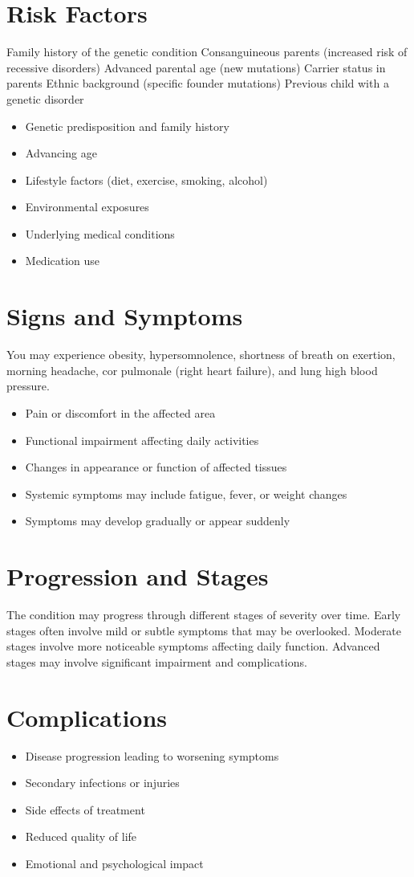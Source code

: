 \section{Risk Factors}
Family history of the genetic condition Consanguineous parents (increased risk of recessive disorders) Advanced parental age (new mutations) Carrier status in parents Ethnic background (specific founder mutations) Previous child with a genetic disorder

\begin{itemize}[noitemsep]
  \item Genetic predisposition and family history
  \item Advancing age
  \item Lifestyle factors (diet, exercise, smoking, alcohol)
  \item Environmental exposures
  \item Underlying medical conditions
  \item Medication use
\end{itemize}
\section{Signs and Symptoms}
You may experience obesity, hypersomnolence, shortness of breath on exertion, morning headache, cor pulmonale (right heart failure), and lung high blood pressure.

\begin{itemize}[noitemsep]
  \item Pain or discomfort in the affected area
  \item Functional impairment affecting daily activities
  \item Changes in appearance or function of affected tissues
  \item Systemic symptoms may include fatigue, fever, or weight changes
  \item Symptoms may develop gradually or appear suddenly
\end{itemize}
\section{Progression and Stages}
The condition may progress through different stages of severity over time. Early stages often involve mild or subtle symptoms that may be overlooked. Moderate stages involve more noticeable symptoms affecting daily function. Advanced stages may involve significant impairment and complications.
\section{Complications}
\begin{itemize}[noitemsep]
  \item Disease progression leading to worsening symptoms
  \item Secondary infections or injuries
  \item Side effects of treatment
  \item Reduced quality of life
  \item Emotional and psychological impact
\end{itemize}
